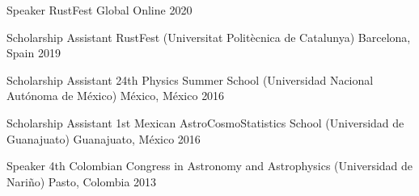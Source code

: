 


\begin{cvhonors}

    \cvhonor
    {Speaker}
    {RustFest Global}
    {Online}
    {2020}

    \cvhonor
    {Scholarship Assistant}
    {RustFest (Universitat Politècnica de Catalunya)}
    {Barcelona, Spain}
    {2019}

    \cvhonor
    {Scholarship Assistant} %
    {24th Physics Summer School (Universidad Nacional Autónoma de México)} %
    {México, México} %
    {2016} %

    \cvhonor
    {Scholarship Assistant} %
    {1st Mexican AstroCosmoStatistics School (Universidad de Guanajuato)} %
    {Guanajuato, México} %
    {2016} %

    \cvhonor
    {Speaker} %
    {4th Colombian Congress in Astronomy and Astrophysics (Universidad de Nariño)} %
    {Pasto, Colombia} %
    {2013} %

\end{cvhonors}

